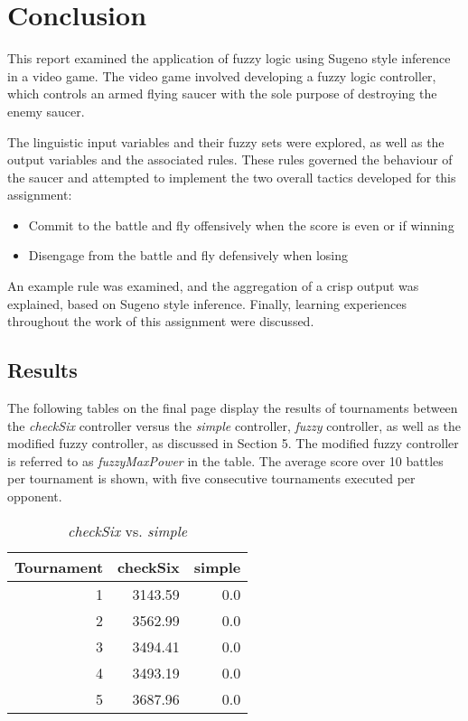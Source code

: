 \newpage

\section{Conclusion}

This report examined the application of fuzzy logic using Sugeno style inference in a video game. The video game involved developing a fuzzy logic controller, which controls an armed flying saucer with the sole purpose of destroying the enemy saucer.

The linguistic input variables and their fuzzy sets were explored, as well as the output variables and the associated rules. These rules governed the behaviour of the saucer and attempted to implement the two overall tactics developed for this assignment:

\begin{itemize}
	\item Commit to the battle and fly offensively when the score is even or if winning
	\item Disengage from the battle and fly defensively when losing
\end{itemize}

An example rule was examined, and the aggregation of a crisp output was explained, based on Sugeno style inference. Finally, learning experiences throughout the work of this assignment were discussed.

\subsection{Results}

The following tables on the final page display the results of tournaments between the \emph{checkSix} controller versus the \emph{simple} controller, \emph{fuzzy} controller, as well as the modified fuzzy controller, as discussed in Section 5. The modified fuzzy controller is referred to as \emph{fuzzyMaxPower} in the table. The average score over 10 battles per tournament is shown, with five consecutive tournaments executed per opponent.

\newpage

\begin{table}[H]
\centering
\caption{\emph{checkSix} vs. \emph{simple}}
\label{checkSix vs. simple}
\begin{tabular}{r|r|r}
Tournament	& checkSix	& simple	\\ \hline
1			& 3143.59	& 0.0		\\
2			& 3562.99	& 0.0		\\
3			& 3494.41	& 0.0		\\
4			& 3493.19	& 0.0		\\
5			& 3687.96	& 0.0
\end{tabular}
\end{table}

